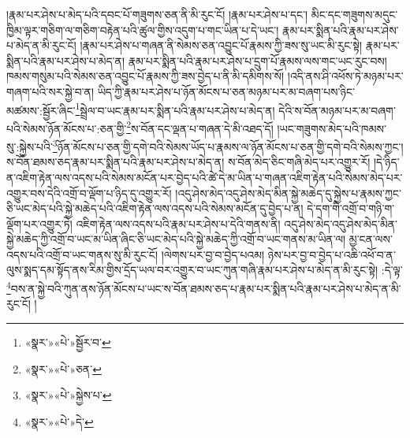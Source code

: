 །རྣམ་པར་ཤེས་པ་མེད་པའི་དབང་པོ་གཟུགས་ཅན་ནི་མི་རུང་ངོ། །རྣམ་པར་ཤེས་པ་དང་། མིང་དང་གཟུགས་མདུང་ཁྱིམ་ལྟར་གཅིག་ལ་གཅིག་བརྟེན་པའི་ཚུལ་གྱིས་འདུག་པ་གང་ཡིན་པ་དེ་ཡང་། རྣམ་པར་སྨིན་པའི་རྣམ་པར་ཤེས་པ་མེད་ན་མི་རུང་ངོ། །རྣམ་པར་ཤེས་པ་གཞན་ནི་སེམས་ཅན་འབྱུང་པོ་རྣམས་ཀྱི་ཟས་སུ་ཡང་མི་རུང་སྟེ། རྣམ་པར་སྨིན་པའི་རྣམ་པར་ཤེས་པ་མེད་ན། རྣམ་པར་སྨིན་པའི་རྣམ་པར་ཤེས་པ་དྲུག་པོ་རྣམས་ལས་གང་ཡང་རུང་བས། ཁམས་གསུམ་པའི་སེམས་ཅན་འབྱུང་པོ་རྣམས་ཀྱི་ཟས་བྱེད་པ་ནི་མི་དམིགས་སོ། །འདི་ནས་ཤི་འཕོས་ཏེ་མཉམ་པར་གཞག་པའི་སར་སྐྱེ་བ་ན། ཡིད་ཀྱི་རྣམ་པར་ཤེས་པ་ཉོན་མོངས་པ་ཅན་མཉམ་པར་མ་བཞག་པས་ཉིང་མཚམས་:སྦྱོར་ཞིང་\footnote{«སྣར་»«པེ་»སྦྱོར་བ་}སྦྲེལ་བ་ཡང་རྣམ་པར་སྨིན་པའི་རྣམ་པར་ཤེས་པ་མེད་ན། དེའི་ས་བོན་མཉམ་པར་མ་བཞག་པའི་སེམས་ཉོན་མོངས་པ་:ཅན་གྱི་\footnote{«སྣར་»«པེ་»ཅན་}ས་བོན་དང་ལྡན་པ་གཞན་དེ་མི་འཐད་དོ། །ཡང་གཟུགས་མེད་པའི་ཁམས་སུ་:སྐྱེས་པའི་\footnote{«སྣར་»«པེ་»སྐྱེས་པ་}ཉོན་མོངས་པ་ཅན་གྱི་དགེ་བའི་སེམས་ཡོད་པ་རྣམས་ལ་ཉོན་མོངས་པ་ཅན་གྱི་དགེ་བའི་སེམས་ཀྱང་། ས་བོན་ཐམས་ཅད་རྣམ་པར་སྨིན་པའི་རྣམ་པར་ཤེས་པ་མེད་ན། ས་བོན་མེད་ཅིང་གཞི་མེད་པར་འགྱུར་རོ། །དེ་ཉིད་ན་འཇིག་རྟེན་ལས་འདས་པའི་སེམས་མངོན་པར་བྱེད་པའི་ཚེ་དེ་མ་ཡིན་པ་གཞན་འཇིག་རྟེན་པའི་སེམས་མེད་པར་འགྱུར་བས་དེའི་འགྲོ་བ་ལྡོག་པ་ཉིད་དུ་འགྱུར་རོ། །འདུ་ཤེས་མེད་འདུ་ཤེས་མེད་མིན་སྐྱེ་མཆེད་དུ་སྐྱེས་པ་རྣམས་ཀྱང་ཅི་ཡང་མེད་པའི་སྐྱེ་མཆེད་པའི་འཇིག་རྟེན་ལས་འདས་པའི་སེམས་མངོན་དུ་བྱེད་པ་ན། དེ་དག་གི་འགྲོ་བ་གཉི་ག་ལྡོག་པར་འགྱུར་ཏེ། འཇིག་རྟེན་ལས་འདས་པའི་རྣམ་པར་ཤེས་པ་དེའི་གནས་ནི། འདུ་ཤེས་མེད་འདུ་ཤེས་མེད་མིན་སྐྱེ་མཆེད་ཀྱི་འགྲོ་བ་ཡང་མ་ཡིན་ཞིང་ཅི་ཡང་མེད་པའི་སྐྱེ་མཆེད་ཀྱི་འགྲོ་བ་ཡང་གནས་མ་ཡིན་ལ། མྱ་ངན་ལས་འདས་པའི་འགྲོ་བ་ཡང་གནས་སུ་མི་རུང་ངོ། །ལེགས་པར་བྱ་བ་བྱེད་པའམ། ཉེས་པར་བྱ་བ་བྱེད་པ་འཆི་འཕོ་བ་ན་ལུས་སྨད་དམ་སྟོད་ནས་རིམ་གྱིས་དྲོད་ཡལ་བར་འགྱུར་བ་ཡང་ཀུན་གཞི་རྣམ་པར་ཤེས་པ་མེད་ན་མི་རུང་སྟེ། :དེ་ལྟ་\footnote{«སྣར་»«པེ་»དེ་}བས་ན་སྐྱེ་བའི་ཀུན་ནས་ཉོན་མོངས་པ་ཡང་ས་བོན་ཐམས་ཅད་པ་རྣམ་པར་སྨིན་པའི་རྣམ་པར་ཤེས་པ་མེད་ན་མི་རུང་ངོ། །
